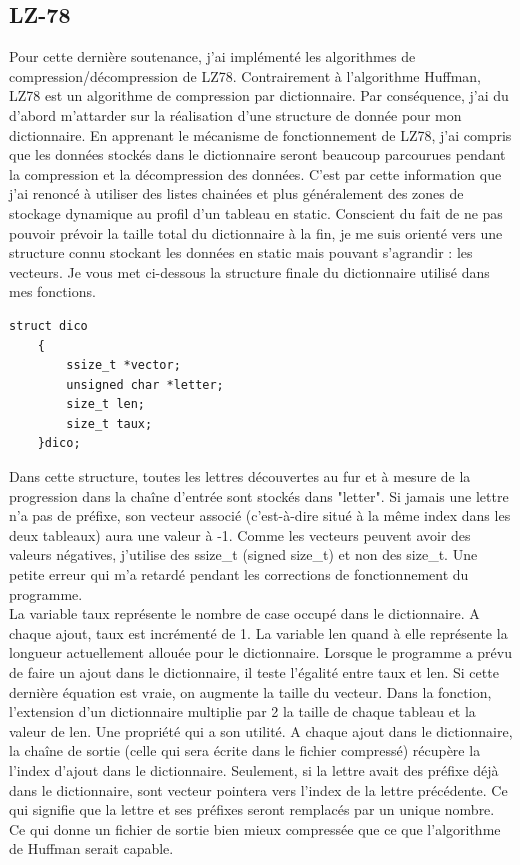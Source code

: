     \subsection{LZ-78}
        Pour cette dernière soutenance, j'ai implémenté les algorithmes de compression/décompression de LZ78. Contrairement à l'algorithme Huffman, LZ78 est un algorithme de compression par dictionnaire. Par conséquence, j'ai du d'abord m'attarder sur la réalisation d'une structure de donnée pour mon dictionnaire. En apprenant le mécanisme de fonctionnement de LZ78, j'ai compris que les données stockés dans le dictionnaire seront beaucoup parcourues pendant la compression et la décompression des données. C'est par cette information que j'ai renoncé à utiliser des listes chainées et plus généralement des zones de stockage dynamique au profil d'un tableau en static. Conscient du fait de ne pas pouvoir prévoir la taille total du dictionnaire à la fin, je me suis orienté vers une structure connu stockant les données en static mais pouvant s'agrandir : les vecteurs. Je vous met ci-dessous la structure finale du dictionnaire utilisé dans mes fonctions.
        \begin{lstlisting}[style=CStyle]
    struct dico
    {
        ssize_t *vector;
        unsigned char *letter;
        size_t len;
        size_t taux;
    }dico;
		\end{lstlisting}
        Dans cette structure, toutes les lettres découvertes au fur et à mesure de la progression dans la chaîne d'entrée sont stockés dans "letter". Si jamais une lettre n'a pas de préfixe, son vecteur associé (c'est-à-dire situé à la même index dans les deux tableaux) aura une valeur à -1. Comme les vecteurs peuvent avoir des valeurs négatives, j'utilise des ssize\_t (signed size\_t) et non des size\_t. Une petite erreur qui m'a retardé pendant les corrections de fonctionnement du programme.\\
        La variable taux représente le nombre de case occupé dans le dictionnaire. A chaque ajout, taux est incrémenté de 1. La variable len quand à elle représente la longueur actuellement allouée pour le dictionnaire. Lorsque le programme a prévu de faire un ajout dans le dictionnaire, il teste l'égalité entre taux et len. Si cette dernière équation est vraie, on augmente la taille du vecteur. Dans la fonction, l'extension d'un dictionnaire multiplie par 2 la taille de chaque tableau et la valeur de len. Une propriété qui a son utilité.
        A chaque ajout dans le dictionnaire, la chaîne de sortie (celle qui sera écrite dans le fichier compressé) récupère la l'index d'ajout dans le dictionnaire. Seulement, si la lettre avait des préfixe déjà dans le dictionnaire, sont vecteur pointera vers l'index de la lettre précédente. Ce qui signifie que la lettre et ses préfixes seront remplacés par un unique nombre. Ce qui donne un fichier de sortie bien mieux compressée que ce que l'algorithme de Huffman serait capable.\\
